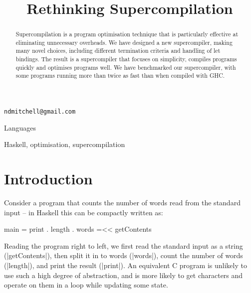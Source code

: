 \documentclass[draft]{sigplanconf}
\begin{document}

\preprintfooter{}   %

\title{Rethinking Supercompilation}

           {\verb"ndmitchell@gmail.com"}

\maketitle


\begin{abstract}
Supercompilation is a program optimisation technique that is particularly effective at eliminating unnecessary overheads. We have designed a new supercompiler, making many novel choices, including different termination criteria and handling of let bindings. The result is a supercompiler that focuses on simplicity, compiles programs quickly and optimises programs well. We have benchmarked our supercompiler, with some programs running more than twice as fast than when compiled with GHC.
\end{abstract}


\terms
Languages

\keywords
Haskell, optimisation, supercompilation

\section{Introduction}
\label{sec:introduction}

Consider a program that counts the number of words read from the standard input -- in Haskell \cite{haskell} this can be compactly written as:

\begin{code}
main = print . length . words =<< getContents
\end{code}

Reading the program right to left, we first read the standard input as a string (|getContents|), then split it in to words (|words|), count the number of words (|length|), and print the result (|print|). An equivalent C program is unlikely to use such a high degree of abstraction, and is more likely to get characters and operate on them in a loop while updating some state.
\end{document}
